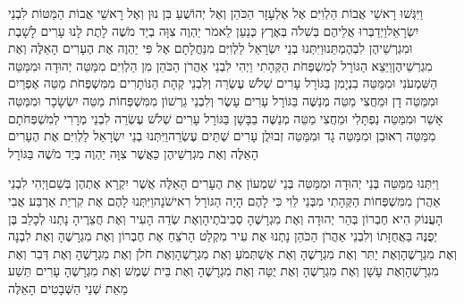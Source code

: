\documentclass[../main/main.tex]{subfiles}
\begin{document}
\begin{multicols*}{\ncols}
וַיִּגְּשׁוּ רָאשֵׁי אֲבוֹת הַלְוִיִּם אֶל אֶלְעָזָר הַכֹּהֵן וְאֶל יְהוֹשֻׁעַ בִּן נוּן וְאֶל רָאשֵׁי אֲבוֹת הַמַּטּוֹת לִבְנֵי יִשְׂרָאֵל\PreVerseSpace{}וַיְדַבְּרוּ אֲלֵיהֶם בְּשִׁלֹה בְּאֶרֶץ כְּנַעַן לֵאמֹר יַהְוֶה צִוָּה בְיַד מֹשֶׁה לָתֶת לָנוּ עָרִים לָשָׁבֶת וּמִגְרְשֵׁיהֶן לִבְהֶמְתֵּנוּ\PreVerseSpace{}וַיִּתְּנוּ בְנֵי יִשְׂרָאֵל לַלְוִיִּם מִנַּחֲלָתָם אֶל פִּי יַהְוֶה אֶת הֶעָרִים הָאֵלֶּה וְאֶת מִגְרְשֵׁיהֶן\PreVerseSpace{}וַיֵּצֵא הַגּוֹרָל לְמִשְׁפְּחֹת הַקְּהָתִי וַיְהִי לִבְנֵי אַהֲרֹן הַכֹּהֵן מִן הַלְוִיִּם מִמַּטֵּה יְהוּדָה וּמִמַּטֵּה הַשִּׁמְעֹנִי וּמִמַּטֵּה בִנְיָמִן בַּגּוֹרָל עָרִים שְׁלֹשׁ עֶשְׂרֵה \ClosedSection{}וְלִבְנֵי קְהָת הַנּוֹתָרִים מִמִּשְׁפְּחֹת מַטֵּה אֶפְרַיִם וּמִמַּטֵּה דָן וּמֵחֲצִי מַטֵּה מְנַשֶּׁה בַּגּוֹרָל עָרִים עָשֶׂר \ClosedSection{}וְלִבְנֵי גֵרְשׁוֹן מִמִּשְׁפְּחוֹת מַטֵּה יִשְׂשָׂכָר וּמִמַּטֵּה אָשֵׁר וּמִמַּטֵּה נַפְתָּלִי וּמֵחֲצִי מַטֵּה מְנַשֶּׁה בַבָּשָׁן בַּגּוֹרָל עָרִים שְׁלֹשׁ עֶשְׂרֵה \ClosedSection{}לִבְנֵי מְרָרִי לְמִשְׁפְּחֹתָם מִמַּטֵּה רְאוּבֵן וּמִמַּטֵּה גָד וּמִמַּטֵּה זְבוּלֻן עָרִים שְׁתֵּים עֶשְׂרֵה\PreVerseSpace{}וַיִּתְּנוּ בְנֵי יִשְׂרָאֵל לַלְוִיִּם אֶת הֶעָרִים הָאֵלֶּה וְאֶת מִגְרְשֵׁיהֶן כַּאֲשֶׁר צִוָּה יַהְוֶה בְּיַד מֹשֶׁה בַּגּוֹרָל\OpenSection{}\par
{}וַיִּתְּנוּ מִמַּטֵּה בְּנֵי יְהוּדָה וּמִמַּטֵּה בְּנֵי שִׁמְעוֹן אֵת הֶעָרִים הָאֵלֶּה אֲשֶׁר יִקְרָא אֶתְהֶן בְּשֵׁם\PreVerseSpace{}וַיְהִי לִבְנֵי אַהֲרֹן מִמִּשְׁפְּחוֹת הַקְּהָתִי מִבְּנֵי לֵוִי כִּי לָהֶם הָיָה הַגּוֹרָל רִאישֹׁנָה\SubEnd{}\PreVerseSpace{}וַיִּתְּנוּ לָהֶם אֶת קִרְיַת אַרְבַּע אֲבִי הָעֲנוֹק הִיא חֶבְרוֹן בְּהַר יְהוּדָה וְאֶת מִגְרָשֶׁהָ סְבִיבֹתֶיהָ\PreVerseSpace{}וְאֶת שְׂדֵה הָעִיר וְאֶת חֲצֵרֶיהָ נָתְנוּ לְכָלֵב בֶּן יְפֻנֶּה בַּאֲחֻזָּתוֹ \ClosedSection{}וְלִבְנֵי אַהֲרֹן הַכֹּהֵן נָתְנוּ אֶת עִיר מִקְלַט הָרֹצֵחַ אֶת חֶבְרוֹן וְאֶת מִגְרָשֶׁהָ וְאֶת לִבְנָה וְאֶת מִגְרָשֶׁהָ\PreVerseSpace{}וְאֶת יַתִּר וְאֶת מִגְרָשֶׁהָ וְאֶת אֶשְׁתְּמֹעַ וְאֶת מִגְרָשֶׁהָ\PreVerseSpace{}וְאֶת חֹלֹן וְאֶת מִגְרָשֶׁהָ וְאֶת דְּבִר וְאֶת מִגְרָשֶׁהָ\PreVerseSpace{}וְאֶת עָשָׁן\SubEnd{} וְאֶת מִגְרָשֶׁהָ וְאֶת יֻטָּה וְאֶת מִגְרָשֶׁהָ וְאֶת\SubEnd{} בֵּית שֶׁמֶשׁ וְאֶת מִגְרָשֶׁהָ עָרִים תֵּשַׁע מֵאֵת שְׁנֵי הַשְּׁבָטִים הָאֵלֶּה\OpenSection{}\par

\end{multicols*}
\end{document}
